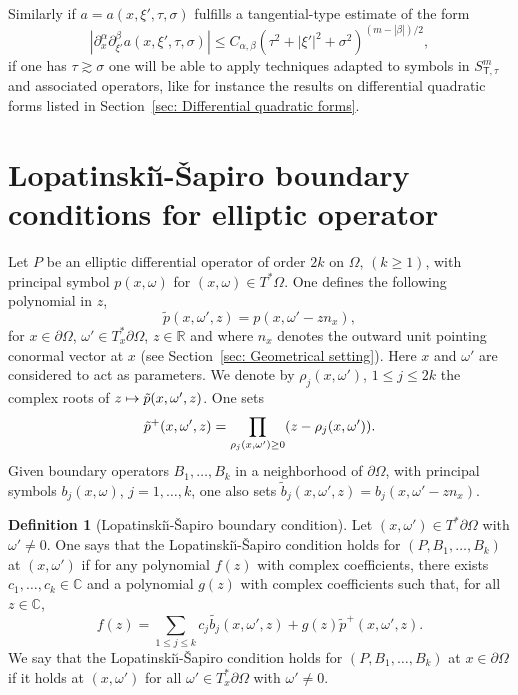 \documentclass[JEP,XML,SOM,Unicode,published]{cedram}
\newcommand\mto{\mathchoice{\longmapsto}{\mapsto}{\mapsto}{\mapsto}}
\theoremstyle{plain}
\theoremstyle{definition}
\newtheorem{definition}[theorem]{Definition}
\def\R{\mathbb{R}}
\def\C{\mathbb{C}}
\newcommand{\LS}{Lopatinski\u{\i}-\v{S}apiro\xspace}
\let \Im \relax
\DeclareMathOperator{\Im}{Im}
\newcommand{\Ssct}{S_{{\scriptscriptstyle{\mathsf T}},\tau}}
\begin{document}
Similarly if $a = a(x,\xi',\tau,\sigma)$ fulfills a tangential-type estimate of the form
\begin{equation*}
|\partial^{\alpha}_x\partial^{\beta}_{\xi'} a(x,\xi',\tau,\sigma)|\leq
C_{\alpha,\beta}(\tau^2+|\xi'|^2+\sigma^2)^{(m-|\beta|)/2},
\end{equation*}
if one has $\tau\gtrsim \sigma$ one will be able to apply techniques
adapted to symbols in $\Ssct^m$ and associated operators, like for instance the results on differential quadratic forms listed in
Section~\ref{sec: Differential quadratic forms}.

\section{Lopatinski\u{\i}-\v{S}apiro boundary conditions for elliptic operator}
\label{sec: LS condition}
Let $P$ be an elliptic differential operator of order $2k$ on
$\Omega$, $(k\geq 1)$, with principal symbol $p(x,\omega)$ for
$(x,\omega)\in T^*\Omega$. One defines the following polynomial in
$z$,\vspace*{-3pt}
\[
\tilde{p}(x,\omega',z)=p(x,\omega'-z n_x),
\]
for
$x\in\partial\Omega$, $\omega'\in T^*_x\partial\Omega$, $z\in\R$ and
where $n_x$ denotes the outward unit pointing conormal vector at $x$
(see Section~\ref{sec: Geometrical setting}). Here $x$ and $\omega'$
are considered to act as parameters. We denote by
$\rho_j(x,\omega')$, $1\leq j\leq 2k$ the complex roots of $z \mto \tilde{p}(x,\omega',z)$. One sets
\[
\tilde{p}^+(x,\omega',z)=\prod_{\Im\rho_j(x,\omega')\geq 0}(z-\rho_j(x,\omega')).
\]
Given boundary operators $B_1,\dots, B_k$ in a neighborhood of $\partial\Omega$, with principal symbols $b_j(x,\omega)$, $j=1,\dots,k$, one also sets $\tilde{b}_j(x,\omega',z)=b_j(x,\omega'-zn_x)$.

\begin{definition}[\LS boundary condition]\label{def: LS}
Let $(x,\omega')\in T^*\partial\Omega$ with $\omega'\neq 0$. One says that the \LS condition holds for $(P, B_1,\dots, B_k)$ at $(x,\omega')$ if for any polynomial $f(z)$ with complex coefficients, there exists \hbox{$c_1,\dots,c_k\in\C$} and a polynomial $g(z)$ with complex coefficients such that, for all $z\in\C$,
\[
f(z)=\sum_{1\leq j\leq k}c_j\tilde{b_j}(x,\omega',z)+g(z)\tilde{p}^+(x,\omega',z).
\]
We say that the \LS condition holds for $(P, B_1,\dots, B_k)$ at $x\in\partial\Omega$ if it holds at $(x,\omega')$ for all $\omega'\in T^*_x\partial\Omega$ with $\omega'\neq 0$.
\end{definition}
\end{document}
